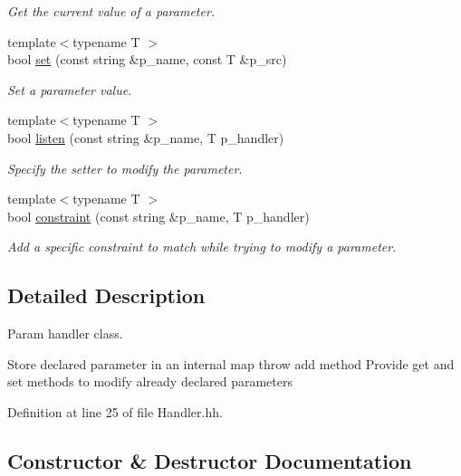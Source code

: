 \begin{DoxyCompactItemize}
\begin{DoxyCompactList}\small\item\em Get the current value of a parameter. \end{DoxyCompactList}\item 
{\footnotesize template$<$typename T $>$ }\\bool \hyperlink{classxtd_1_1servers_1_1param_1_1Handler_af8dbec0f2d639d39fb11605609462dee}{set} (const string \&p\+\_\+name, const T \&p\+\_\+src)
\begin{DoxyCompactList}\small\item\em Set a parameter value. \end{DoxyCompactList}\item 
{\footnotesize template$<$typename T $>$ }\\bool \hyperlink{classxtd_1_1servers_1_1param_1_1Handler_a3e71b80a00c962a862c1d3cc4d623c05}{listen} (const string \&p\+\_\+name, T p\+\_\+handler)
\begin{DoxyCompactList}\small\item\em Specify the setter to modify the parameter. \end{DoxyCompactList}\item 
{\footnotesize template$<$typename T $>$ }\\bool \hyperlink{classxtd_1_1servers_1_1param_1_1Handler_a20d689629d4748c14e4a516580a7c55a}{constraint} (const string \&p\+\_\+name, T p\+\_\+handler)
\begin{DoxyCompactList}\small\item\em Add a specific constraint to match while trying to modify a parameter. \end{DoxyCompactList}\end{DoxyCompactItemize}


\subsection{Detailed Description}
Param handler class. 

Store declared parameter in an internal map throw add method Provide get and set methods to modify already declared parameters 

Definition at line 25 of file Handler.\+hh.



\subsection{Constructor \& Destructor Documentation}

